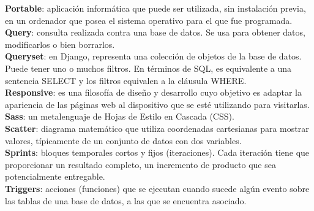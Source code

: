 \textbf{Portable}: aplicación informática que puede ser utilizada, sin instalación previa, en un ordenador que posea el sistema operativo para el que fue programada.\\

\textbf{Query}:  consulta realizada contra una base de datos. Se usa para obtener datos, modificarlos o bien borrarlos.\\

\textbf{Queryset}: en Django, representa una colección de objetos de la base de datos. Puede tener uno o muchos filtros. En términos de SQL, es equivalente a una sentencia SELECT y los filtros equivalen a la cláusula WHERE.\\

\textbf{Responsive}: es una filosofía de diseño y desarrollo cuyo objetivo es adaptar la apariencia de las páginas web al dispositivo que se esté utilizando para visitarlas.\\

\textbf{Sass}: un metalenguaje de Hojas de Estilo en Cascada (CSS).\\

\textbf{Scatter}: diagrama matemático que utiliza coordenadas cartesianas para mostrar valores, típicamente de un conjunto de datos con dos variables.\\

\textbf{Sprints}:  bloques temporales cortos y fijos (iteraciones). Cada iteración tiene que proporcionar un resultado completo, un incremento de producto que sea potencialmente entregable.\\

\textbf{Triggers}: acciones (funciones) que se ejecutan cuando sucede algún evento sobre las tablas de una base de datos, a las que se encuentra asociado.

\clearpage
